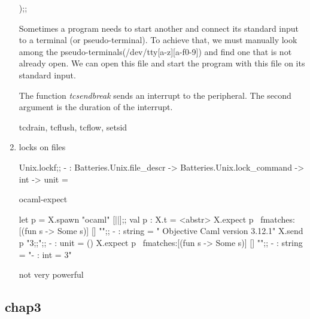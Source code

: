 \begin{enumerate}
\begin{bluecode}
);;
\end{bluecode}
 Sometimes a program needs to start another and connect its standard
 input to a terminal (or pseudo-terminal). To achieve that, we must
 manually look among the pseudo-terminals(/dev/tty[a-z][a-f0-9]) and
 find one that is not already open. We can open this file and start
 the program with this file on its standard input.

 The function \textit{tcsendbreak} sends an interrupt to the
 peripheral. The second argument is the duration of the interrupt.


 \begin{bluetext}
   tcdrain, tcflush, tcflow, setsid
 \end{bluetext}

\item locks on files
  \begin{bluetext}
Unix.lockf;;
- : Batteries.Unix.file_descr -> Batteries.Unix.lock_command -> int -> unit =    
\end{bluetext}

ocaml-expect
\begin{alternate}
let p = X.spawn "ocaml" [||];;
val p : X.t = <abstr>
X.expect p ~fmatches:[(fun s -> Some s)] [] "";;
- : string = "        Objective Caml version 3.12.1"
X.send p "3;;\n";;
- : unit = ()
X.expect p ~fmatches:[(fun s -> Some s)] [] "";;
- : string = "- : int = 3"  
\end{alternate}

not very powerful
\end{enumerate}

\subsection{chap3}
\label{sec:chap3}



